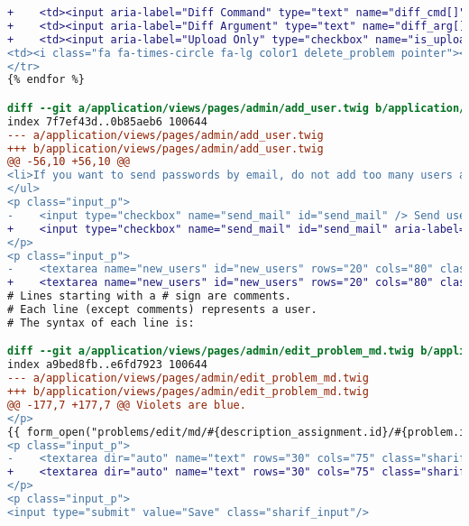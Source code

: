\begin{itemize}
\begin{lstlisting}[language=diff, caption=Perubahan untuk mematuhi kriteria 1.3.1, label=lst_1.3.1, basicstyle=\ttfamily, frame=single,
columns=fullflexible, keepspaces=true, breaklines=true]
+    <td><input aria-label="Diff Command" type="text" name="diff_cmd[]" class="sharif_input tiny" value="{{ problem.diff_cmd }}"/></td>
+    <td><input aria-label="Diff Argument" type="text" name="diff_arg[]" class="sharif_input tiny" value="{{ problem.diff_arg }}"/></td>
+    <td><input aria-label="Upload Only" type="checkbox" name="is_upload_only[]" class="check" value="{{ problem.id }}" {{ problem.is_upload_only ? 'checked' }}/></td>
<td><i class="fa fa-times-circle fa-lg color1 delete_problem pointer"></i></td>
</tr>
{% endfor %}

diff --git a/application/views/pages/admin/add_user.twig b/application/views/pages/admin/add_user.twig
index 7f7ef43d..0b85aeb6 100644
--- a/application/views/pages/admin/add_user.twig
+++ b/application/views/pages/admin/add_user.twig
@@ -56,10 +56,10 @@
<li>If you want to send passwords by email, do not add too many users at one time. This may result in mail delivery fail.</li>
</ul>
<p class="input_p">
-    <input type="checkbox" name="send_mail" id="send_mail" /> Send usernames and passwords by email (Waits <input type="text" name="delay" id="delay" class="sharif_input tiny" value="2"/> second(s) before sending each email, so please be patient).
+    <input type="checkbox" name="send_mail" id="send_mail" aria-label="Send mail"/> Send usernames and passwords by email (Waits <input type="text" name="delay" id="delay" class="sharif_input tiny" value="2" aria-label="Delay"/> second(s) before sending each email, so please be patient).
</p>
<p class="input_p">
-    <textarea name="new_users" id="new_users" rows="20" cols="80" class="sharif_input">
+    <textarea name="new_users" id="new_users" rows="20" cols="80" class="sharif_input" aria-label="Command for creating new user">
# Lines starting with a # sign are comments.
# Each line (except comments) represents a user.
# The syntax of each line is:

diff --git a/application/views/pages/admin/edit_problem_md.twig b/application/views/pages/admin/edit_problem_md.twig
index a9bed8fb..e6fd7923 100644
--- a/application/views/pages/admin/edit_problem_md.twig
+++ b/application/views/pages/admin/edit_problem_md.twig
@@ -177,7 +177,7 @@ Violets are blue.
</p>
{{ form_open("problems/edit/md/#{description_assignment.id}/#{problem.id}") }}
<p class="input_p">
-    <textarea dir="auto" name="text" rows="30" cols="75" class="sharif_input" id="md_editor">{{ problem.description }}</textarea>
+    <textarea dir="auto" name="text" rows="30" cols="75" class="sharif_input" id="md_editor" aria-label="Markdown Editor">{{ problem.description }}</textarea>
</p>
<p class="input_p">
<input type="submit" value="Save" class="sharif_input"/>


\end{lstlisting}
\end{itemize}
